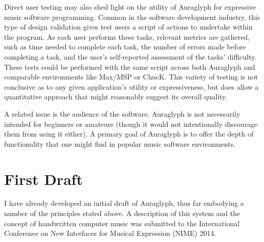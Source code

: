 \documentclass[10pt,letterpaper]{article}
\begin{document}
Direct user testing may also shed light on the utility of Auraglyph for expressive music software programming. 
Common in the software development industry, this type of design validation gives test users a script of actions to undertake within the program. 
As each user performs these tasks, relevant metrics are gathered, such as time needed to complete each task, the number of errors made before completing a task, and the user's self-reported assessment of the tasks' difficulty. 
These tests could be performed with the same script across both Auraglyph and comparable environments like Max/MSP or ChucK. 
This variety of testing is not conclusive as to any given application's utility or expressiveness, but does allow a quantitative approach that might reasonably suggest its overall quality. 

A related issue is the audience of the software. 
Auraglyph is not necessarily intended for beginners or amateurs (though it would not intentionally discourage them from using it either). 
A primary goal of Auraglyph is to offer the depth of functionality that one might find in popular music software environments. 


\section{First Draft}
\label{sec:SystemDescription}

I have already developed an initial draft of Auraglyph, thus far embodying a number of the principles stated above. 
A description of this system and the concept of handwritten computer music was submitted to the International Conference on New Interfaces for Musical Expression (NIME) 2014. 

\end{document}
